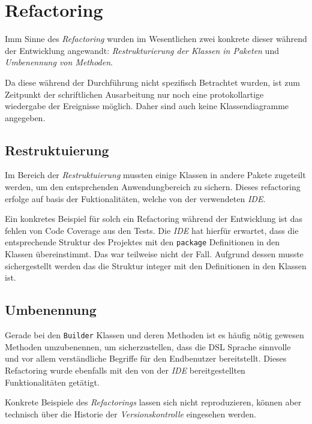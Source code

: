 \section{Refactoring}
\label{sec:refactoring}

Imm Sinne des \emph{Refactoring} wurden im Wesentlichen zwei konkrete dieser während der Entwicklung angewandt: \emph{Restrukturierung der Klassen in Paketen} und \emph{Umbenennung von Methoden}.

Da diese während der Durchführung nicht spezifisch Betrachtet wurden, ist zum Zeitpunkt der schriftlichen Ausarbeitung nur noch eine protokollartige wiedergabe der Ereignisse möglich.
Daher sind auch keine Klassendiagramme angegeben.

\subsection{Restruktuierung}
\label{subsec:restrukturierung}

Im Bereich der \emph{Restruktuierung} mussten einige Klassen in andere Pakete zugeteilt werden, um den entsprchenden Anwendungbereich zu sichern.
Dieses refactoring erfolge auf basis der Fuktionalitäten, welche von der verwendeten \emph{IDE}.

Ein konkretes Beispiel für solch ein Refactoring während der Entwicklung ist das fehlen von Code Coverage aus den Tests.
Die \emph{IDE} hat hierfür erwartet, dass die entsprechende Struktur des Projektes mit den \texttt{package} Definitionen in den Klassen übereinstimmt.
Das war teilweise nicht der Fall.
Aufgrund dessen musste sichergestellt werden das die Struktur integer mit den Definitionen in den Klassen ist.

\subsection{Umbenennung}
\label{subsec:umbenennung}

Gerade bei den \texttt{Builder} Klassen und deren Methoden ist es häufig nötig gewesen Methoden umzubenennen, um sicherzustellen, dass die DSL Sprache sinnvolle und vor allem verständliche Begriffe für den Endbenutzer bereitstellt.
Dieses Refactoring wurde ebenfalls mit den von der \emph{IDE} bereitgestellten Funktionalitäten getätigt.

Konkrete Beispiele des \emph{Refactorings} lassen sich nicht reproduzieren, können aber technisch über die Historie der \emph{Versionskontrolle} eingesehen werden.